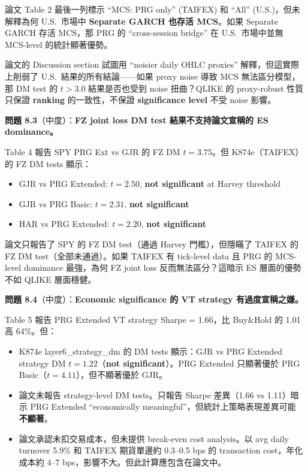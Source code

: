 \documentclass[12pt,a4paper]{article}
\begin{document}
論文 Table 2 最後一列標示 ``MCS: PRG only'' (TAIFEX) 和 ``All'' (U.S.)，但未解釋為何 U.S.\ 市場中 \textbf{Separate GARCH 也存活 MCS}。如果 Separate GARCH 存活 MCS，那 PRG 的 ``cross-session bridge'' 在 U.S.\ 市場中並無 MCS-level 的統計顯著優勢。

論文的 Discussion section 試圖用 ``noisier daily OHLC proxies'' 解釋，但這實際上削弱了 U.S.\ 結果的所有結論——如果 proxy noise 導致 MCS 無法區分模型，那 DM test 的 $t > 3.0$ 結果是否也受到 noise 扭曲？QLIKE 的 proxy-robust 性質只保證 \textbf{ranking} 的一致性，不保證 \textbf{significance level} 不受 noise 影響。

\textbf{問題 8.3}（\textcolor{warncolor}{中度}）：\textbf{FZ joint loss DM test 結果不支持論文宣稱的 ES dominance。}

Table 4 報告 SPY PRG Ext vs GJR 的 FZ DM $t = 3.75$。但 K874e（TAIFEX）的 FZ DM tests 顯示：
\begin{itemize}
    \item GJR vs PRG Extended: $t = 2.50$, \textbf{not significant} at Harvey threshold
    \item GJR vs PRG Basic: $t = 2.31$, \textbf{not significant}
    \item HAR vs PRG Extended: $t = 2.20$, \textbf{not significant}
\end{itemize}

論文只報告了 SPY 的 FZ DM test（通過 Harvey 門檻），但隱瞞了 TAIFEX 的 FZ DM test（全部未通過）。如果 TAIFEX 有 tick-level data 且 PRG 的 MCS-level dominance 最強，為何 FZ joint loss 反而無法區分？這暗示 ES 層面的優勢不如 QLIKE 層面穩健。

\textbf{問題 8.4}（\textcolor{warncolor}{中度}）：\textbf{Economic significance 的 VT strategy 有過度宣稱之嫌。}

Table 5 報告 PRG Extended VT strategy Sharpe = 1.66，比 Buy\&Hold 的 1.01 高 64\%。但：
\begin{itemize}
    \item K874e layer6\_strategy\_dm 的 DM tests 顯示：GJR vs PRG Extended strategy DM $t = 1.22$（\textbf{not significant}）。PRG Extended 只顯著優於 PRG Basic（$t = 4.11$），但不顯著優於 GJR。
    \item 論文未報告 strategy-level DM tests。只報告 Sharpe 差異（1.66 vs 1.11）暗示 PRG Extended ``economically meaningful''，但統計上策略表現差異可能 \textbf{不顯著}。
    \item 論文承認未扣交易成本，但未提供 break-even cost analysis。以 avg daily turnover 5.9\% 和 TAIFEX 期貨單邊約 0.3--0.5 bps 的 transaction cost，年化成本約 4--7 bps，影響不大。但此計算應包含在論文中。
\end{itemize}
\end{document}
